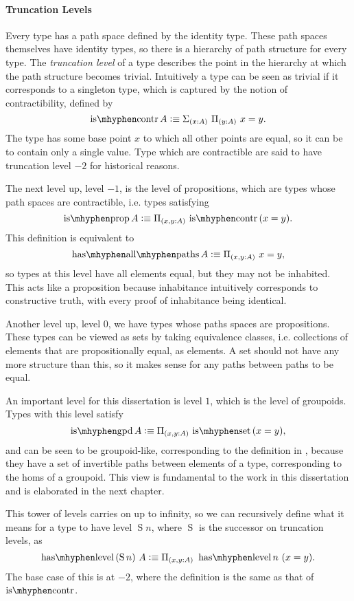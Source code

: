 \documentclass[12pt, parskip, DIV=14]{scrbook}
\newcommand{\defeq}{\vcentcolon\equiv}
\newcommand{\iscontr}{\operatorname{is\mhyphen contr}}
\newcommand{\isprop}{\operatorname{is\mhyphen prop}}
\newcommand{\hasallpaths}{\operatorname{has\mhyphen all\mhyphen paths}}
\newcommand{\isset}{\operatorname{is\mhyphen set}}
\newcommand{\isgpd}{\operatorname{is\mhyphen gpd}}
\newcommand{\haslevel}{\operatorname{has\mhyphen level}}
\newcommand{\Suc}{\operatorname{S}}
\begin{document}
\paragraph{Truncation Levels}

Every type has a path space defined by the identity type. These path spaces themselves have identity types, so there is a hierarchy of path structure for every type. The \textit{truncation level} of a type describes the point in the hierarchy at which the path structure becomes trivial. Intuitively a type can be seen as trivial if it corresponds to a singleton type, which is captured by the notion of contractibility, defined by
$$\iscontr A \defeq \Sigma_{(x : A)}~\Pi_{(y : A)}~x = y.$$
The type has some base point $x$ to which all other points are equal, so it can be to contain only a single value. Type which are contractible are said to have truncation level $-2$ for historical reasons.

The next level up, level $-1$, is the level of propositions, which are types whose path spaces are contractible, i.e. types satisfying
$$\isprop A \defeq \Pi_{(x,y :A)}\,\iscontr\,(x = y).$$
This definition is equivalent to
$$\hasallpaths A \defeq \Pi_{(x , y : A)}~x = y,$$
so types at this level have all elements equal, but they may not be inhabited. This acts like a proposition because inhabitance intuitively corresponds to constructive truth, with every proof of inhabitance being identical.

Another level up, level $0$, we have types whose paths spaces are propositions. These types can be viewed as sets by taking equivalence classes, i.e. collections of elements that are propositionally equal, as elements. A set should not have any more structure than this, so it makes sense for any paths between paths to be equal.

An important level for this dissertation is level $1$, which is the level of groupoids. Types with this level satisfy
$$\isgpd A \defeq \Pi_{(x , y : A)}\,\isset\,(x = y),$$
and can be seen to be groupoid-like, corresponding to the definition in , because they have a set of invertible paths between elements of a type, corresponding to the homs of a groupoid. This view is fundamental to the work in this dissertation and is elaborated in the next chapter.

This tower of levels carries on up to infinity, so we can recursively define what it means for a type to have level $\Suc n$, where $\Suc$ is the successor on truncation levels, as
$$\haslevel\,(\Suc n)~A \defeq \Pi_{(x , y : A)}~\haslevel n~(x = y).$$ The base case of this is at $-2$, where the definition is the same as that of $\iscontr$.
\end{document}
